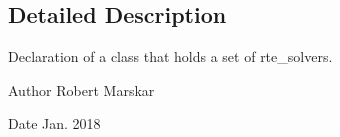 \subsection{Detailed Description}
Declaration of a class that holds a set of rte\+\_\+solvers. 

\begin{DoxyAuthor}{Author}
Robert Marskar 
\end{DoxyAuthor}
\begin{DoxyDate}{Date}
Jan. 2018 
\end{DoxyDate}
